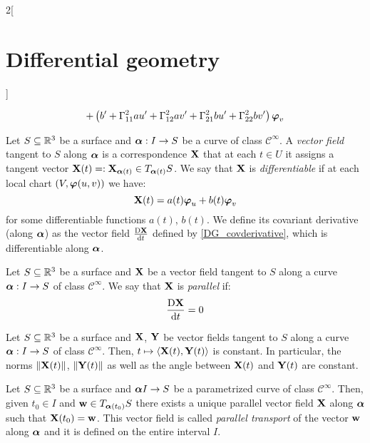 \documentclass[../../../main.tex]{subfiles}
\begin{document}
\begin{multicols}{2}[\section{Differential geometry}]
\begin{proposition}
\begin{multline}
      +\left(b'+\Gamma_{11}^2au'+\Gamma_{12}^2av'+\Gamma_{21}^2bu'+\Gamma_{22}^2bv'\right)\boldsymbol{\mathrm{\varphi}}_v
    \end{multline}
  \end{proposition}
  \begin{definition}
    Let $S\subseteq\mathbb{R}^3$ be a surface and $\boldsymbol{\mathrm{\alpha}}:I\rightarrow S$ be a curve of class $\mathcal{C}^\infty$. A \emph{vector field} tangent to $S$ along $\boldsymbol{\mathrm{\alpha}}$ is a correspondence $\boldsymbol{\mathrm{X}}$ that at each $t\in U$ it assigns a tangent vector $\boldsymbol{\mathrm{X}}(t)=:\boldsymbol{\mathrm{X}}_{\boldsymbol{\mathrm{\alpha}}(t)}\in T_{\boldsymbol{\mathrm{\alpha}}(t)}S$. We say that $\boldsymbol{\mathrm{X}}$ is \emph{differentiable} if at each local chart $(V,\boldsymbol{\mathrm{\varphi}}(u,v))$ we have: $$\boldsymbol{\mathrm{X}}(t)=a(t)\boldsymbol{\mathrm{\varphi}}_u+b(t)\boldsymbol{\mathrm{\varphi}}_v$$ for some differentiable functions $a(t)$, $b(t)$. We define its covariant derivative (along $\boldsymbol{\mathrm{\alpha}}$) as the vector field $\frac{\text{D}\boldsymbol{\mathrm{X}}}{\dd{t}}$ defined by \cref{DG_covderivative}, which is differentiable along $\boldsymbol{\mathrm{\alpha}}$.
  \end{definition}
  \begin{definition}
    Let $S\subseteq\mathbb{R}^3$ be a surface and $\boldsymbol{\mathrm{X}}$ be a vector field tangent to $S$ along a curve $\boldsymbol{\mathrm{\alpha}}:I\rightarrow S$ of class $\mathcal{C}^\infty$. We say that $\boldsymbol{\mathrm{X}}$ is \emph{parallel} if: $$\frac{\text{D}\boldsymbol{\mathrm{X}}}{\dd{t}}=0$$
  \end{definition}
  \begin{proposition}
    Let $S\subseteq\mathbb{R}^3$ be a surface and $\boldsymbol{\mathrm{X}}$, $\boldsymbol{\mathrm{Y}}$ be vector fields tangent to $S$ along a curve $\boldsymbol{\mathrm{\alpha}}:I\rightarrow S$ of class $\mathcal{C}^\infty$. Then, $t\mapsto\langle \boldsymbol{\mathrm{X}}(t),\boldsymbol{\mathrm{Y}}(t)\rangle$ is constant. In particular, the norms $\|\boldsymbol{\mathrm{X}}(t)\|$, $\|\boldsymbol{\mathrm{Y}}(t)\|$ as well as the angle between $\boldsymbol{\mathrm{X}}(t)$ and $\boldsymbol{\mathrm{Y}}(t)$ are constant.
  \end{proposition}
  \begin{proposition}
    Let $S\subseteq\mathbb{R}^3$ be a surface and $\boldsymbol{\mathrm{\alpha}} I\rightarrow S$ be a parametrized curve of class $\mathcal{C}^\infty$. Then, given $t_0\in I$ and $\boldsymbol{\mathrm{w}}\in T_{\boldsymbol{\mathrm{\alpha}}(t_0)}S$ there exists a unique parallel vector field $\boldsymbol{\mathrm{X}}$ along $\boldsymbol{\mathrm{\alpha}}$ such that $\boldsymbol{\mathrm{X}}(t_0)=\boldsymbol{\mathrm{w}}$. This vector field is called \emph{parallel transport} of the vector $\boldsymbol{\mathrm{w}}$ along $\boldsymbol{\mathrm{\alpha}}$ and it is defined on the entire interval $I$.
  \end{proposition}

\end{multicols}
\end{document}
